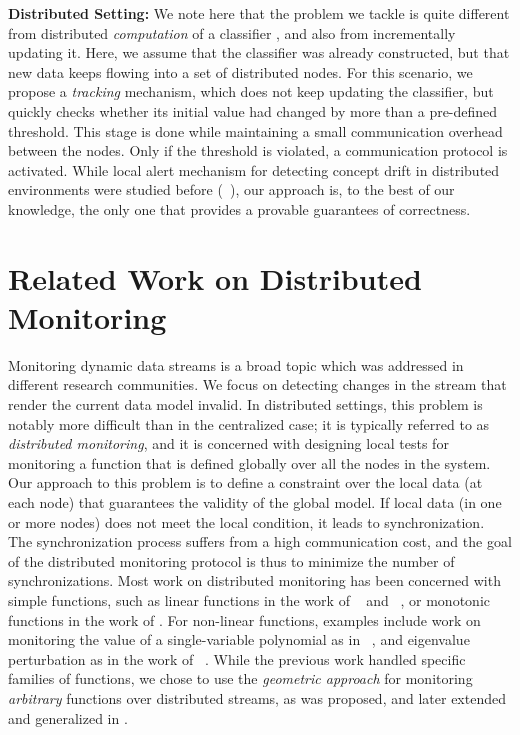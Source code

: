 \noindent \textbf{Distributed Setting:} 
We note here that the problem we tackle is quite different from distributed
{\em computation} of a classifier \cite{macua2011distributed}, and also
from incrementally updating it\cite{pang2005incremental}. Here,
we assume that the classifier was already constructed, but that new data
keeps flowing into a set of distributed nodes. For this scenario, we propose a
{\em tracking} mechanism, which does not keep updating the classifier, but
quickly checks whether its initial value had changed by more than a
pre-defined threshold. This stage is done while maintaining a small
communication overhead between the nodes. Only if the threshold
is violated, a communication protocol is activated. While local alert
mechanism for detecting concept drift in distributed environments
were studied before (~\cite{AngGZPH13}), our approach is, to the best of our knowledge, the only one that provides a provable guarantees of correctness. 

\section{Related Work on Distributed Monitoring}
Monitoring dynamic data streams is a broad topic which was addressed in different research communities. We focus on detecting changes in the stream that render the current data model invalid. 
In distributed settings, this problem is notably more difficult than in the centralized case; it is typically referred to as \textit{distributed monitoring}, and it is concerned with designing local tests for monitoring a function that is defined globally over all the nodes in the system.
Our approach to this problem is to define a constraint over the local data (at each node) that guarantees the validity of the global model. If local data (in one or more nodes) does not meet the local condition, it leads to synchronization. The synchronization process suffers from a high communication cost, and the goal of the distributed monitoring protocol is thus to minimize the number of synchronizations. Most work on distributed monitoring has been concerned with simple functions, such as linear functions in the work of ~\cite{keralapura2006communication} and ~\cite{kashyap2008efficient}, or monotonic functions in the work of \cite{michel2005klee}.
For non-linear functions, examples include work on monitoring the value
of a single-variable polynomial as in  ~\cite{shah2008handling},
and eigenvalue perturbation as in the work of ~\cite{huang2007communication}.
While the previous work handled specific families of functions, we chose to use the 
\textit{geometric approach} for monitoring \textit{arbitrary} functions over distributed streams, as was proposed, and later extended and generalized in \cite{sharfman2007geometric, keren2014geometric, keren2012shape,gabel2015monitoring}. 
%
